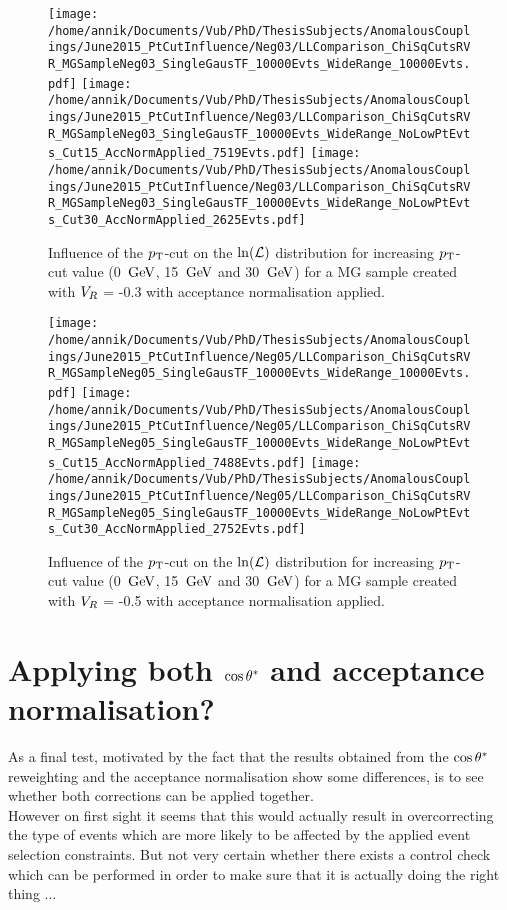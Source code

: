 \begin{figure}[h!t]
 \centering
 \texttt{[image: /home/annik/Documents/Vub/PhD/ThesisSubjects/AnomalousCouplings/June2015\_PtCutInfluence/Neg03/LLComparison\_ChiSqCutsRVR\_MGSampleNeg03\_SingleGausTF\_10000Evts\_WideRange\_10000Evts.pdf]}
 \texttt{[image: /home/annik/Documents/Vub/PhD/ThesisSubjects/AnomalousCouplings/June2015\_PtCutInfluence/Neg03/LLComparison\_ChiSqCutsRVR\_MGSampleNeg03\_SingleGausTF\_10000Evts\_WideRange\_NoLowPtEvts\_Cut15\_AccNormApplied\_7519Evts.pdf]}
 \texttt{[image: /home/annik/Documents/Vub/PhD/ThesisSubjects/AnomalousCouplings/June2015\_PtCutInfluence/Neg03/LLComparison\_ChiSqCutsRVR\_MGSampleNeg03\_SingleGausTF\_10000Evts\_WideRange\_NoLowPtEvts\_Cut30\_AccNormApplied\_2625Evts.pdf]}
 \caption{Influence of the $p_{\textrm T}$-cut on the $\ln(\mathcal{L})$ distribution for increasing $p_{\textrm T}$-cut value (0 $\, \mathrm{GeV}$, 15 $\, \mathrm{GeV}$ and 30 $\, \mathrm{GeV}$) for a MG sample created with $V_{R}$ = -0.3 with acceptance normalisation applied.}
 \label{fig::AccNormNeg03}
\end{figure}

\begin{figure}[h!t]
 \centering
 \texttt{[image: /home/annik/Documents/Vub/PhD/ThesisSubjects/AnomalousCouplings/June2015\_PtCutInfluence/Neg05/LLComparison\_ChiSqCutsRVR\_MGSampleNeg05\_SingleGausTF\_10000Evts\_WideRange\_10000Evts.pdf]}
 \texttt{[image: /home/annik/Documents/Vub/PhD/ThesisSubjects/AnomalousCouplings/June2015\_PtCutInfluence/Neg05/LLComparison\_ChiSqCutsRVR\_MGSampleNeg05\_SingleGausTF\_10000Evts\_WideRange\_NoLowPtEvts\_Cut15\_AccNormApplied\_7488Evts.pdf]}
 \texttt{[image: /home/annik/Documents/Vub/PhD/ThesisSubjects/AnomalousCouplings/June2015\_PtCutInfluence/Neg05/LLComparison\_ChiSqCutsRVR\_MGSampleNeg05\_SingleGausTF\_10000Evts\_WideRange\_NoLowPtEvts\_Cut30\_AccNormApplied\_2752Evts.pdf]}
 \caption{Influence of the $p_{\textrm T}$-cut on the $\ln(\mathcal{L})$ distribution for increasing $p_{\textrm T}$-cut value (0 $\, \mathrm{GeV}$, 15 $\, \mathrm{GeV}$ and 30 $\, \mathrm{GeV}$) for a MG sample created with $V_{R}$ = -0.5 with acceptance normalisation applied.}
 \label{fig::AccNormNeg05}
\end{figure}
 
\section{Applying both $\cos \theta^{*}$ and acceptance normalisation?}

As a final test, motivated by the fact that the results obtained from the $\cos \theta^{*}$ reweighting and the acceptance normalisation show some differences, is to see whether both corrections can be applied together.
\\
However on first sight it seems that this would actually result in overcorrecting the type of events which are more likely to be affected by the applied event selection constraints. But not very certain whether there exists a control check which can be performed in order to make sure that it is actually doing the right thing ...

